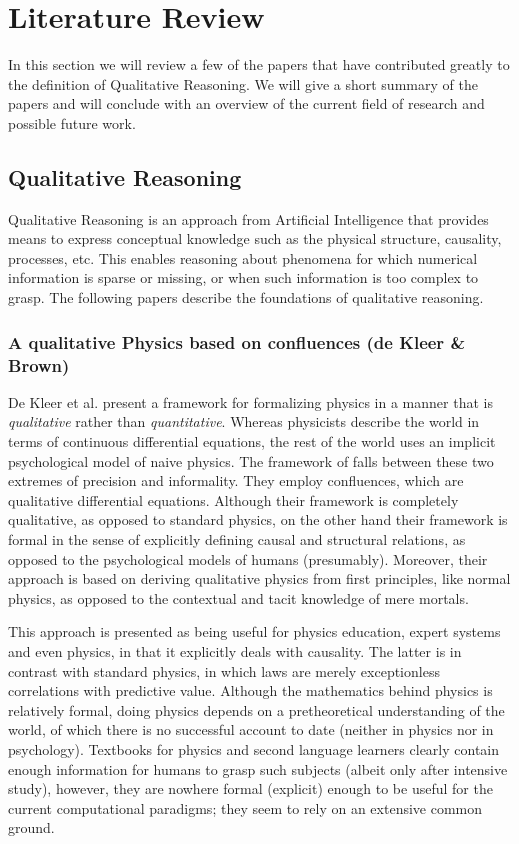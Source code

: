 \documentclass{article} %
\begin{document}
\section{Literature Review}
\label{sec:litrev}
In this section we will review a few of the papers that have contributed
greatly to the definition of Qualitative Reasoning. We will give a short
summary of the papers and will conclude with an overview of the current field
of research and possible future work. 

\subsection{Qualitative Reasoning}
\label{sec:litrev_qr}
Qualitative Reasoning is an approach from Artificial Intelligence that provides
means to express conceptual knowledge such as the physical structure,
causality, processes, etc.  This enables reasoning about phenomena for which
numerical information is sparse or missing, or when such information is too
complex to grasp.  The following papers describe the foundations of qualitative
reasoning.

\subsubsection{A qualitative Physics based on confluences (de Kleer \& Brown)}
\label{sec:litrev_qr_dekleer}
De Kleer et al. \cite{kleer} present a framework for formalizing physics in a
manner that is {\em qualitative} rather than {\em quantitative}. Whereas
physicists describe the world in terms of continuous differential equations,
the rest of the world uses an implicit psychological model of naive physics.
The framework of \cite{kleer} falls between these two extremes of precision and
informality. They employ confluences, which are qualitative differential
equations.  Although their framework is completely qualitative, as opposed to
standard physics, on the other hand their framework is formal in the sense of
explicitly defining causal and structural relations, as opposed to the
psychological models of humans (presumably). Moreover, their approach is based
on deriving qualitative physics from first principles, like normal physics, as
opposed to the contextual and tacit knowledge of mere mortals.

This approach is presented as being useful for physics education, expert
systems and even physics, in that it explicitly deals with causality. The
latter is in contrast with standard physics, in which laws are merely
exceptionless correlations with predictive value. Although the mathematics
behind physics is relatively formal, doing physics depends on a pretheoretical
understanding of the world, of which there is no successful account to date
(neither in physics nor in psychology). Textbooks for physics and second
language learners clearly contain enough information for humans to grasp
such subjects (albeit only after intensive study), however, they are nowhere
formal (explicit) enough to be useful for the current computational paradigms;
they seem to rely on an extensive common ground.
\end{document}
